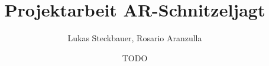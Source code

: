 \documentclass[oneside]{ausarbeitung}
\begin{document}

\Projektbericht
\Informatik


\title{Projektarbeit AR-Schnitzeljagt}
\author{Lukas Steckbauer, Rosario Aranzulla}
\date{TODO}

\examinerIsAProfessorfalse

\maketitle
\cleardoublepage
{}
\setcounter{page}{1}
\makeaffirmation
\cleardoublepage

\begin{abstract}

\end{abstract}

\cleardoublepage
\tableofcontents

\listoffigures
\listoftables
\lstlistoflistings
\listofabbreviations
\begin{acronym}[Bsp.]

\end{acronym}
\cleardoublepage
{}
\setcounter{page}{1}
















\appendix
\printbibliography[heading=bibintoc]




\end{document}

